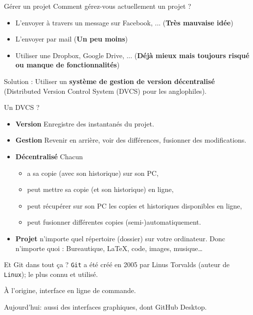 \documentclass{beamer}
\begin{document}
\begin{frame}{Gérer un projet}
Comment gérez-vous actuellement un projet ?

\begin{itemize}
    \item L'envoyer à travers un message sur Facebook, ... (\textbf{Très mauvaise idée})
    \item L'envoyer par mail (\textbf{Un peu moins})
    \item Utiliser une Dropbox, Google Drive, ... (\textbf{Déjà mieux mais toujours risqué ou manque de fonctionnalités})
\end{itemize}

Solution : Utiliser un \textbf{système de gestion de version décentralisé}
(Distributed Version Control System (DVCS) pour les anglophiles).
\end{frame}

\begin{frame}{Un DVCS ?}
    \begin{itemize}
        \item \textbf{Version} Enregistre des \og{}instantanés\fg{} du projet.
        \item \textbf{Gestion} Revenir en arrière, voir des différences,
            fusionner des modifications.
        \item \textbf{Décentralisé} Chacun
            \begin{itemize}
                \item a sa copie (avec son historique) sur son PC,
                \item peut mettre sa copie (et son historique) en ligne,
                \item peut récupérer sur son PC les copies et historiques disponibles en ligne,
                \item peut fusionner différentes copies (semi-)automatiquement.
            \end{itemize}
        \item \textbf{Projet} n'importe quel répertoire (\og dossier\fg) sur votre ordinateur. Donc
            n'importe quoi : Bureautique, \LaTeX, code, images, musique\dots
    \end{itemize}
\end{frame}

\begin{frame}{Et Git dans tout ça ?}
\texttt{Git} a été créé en 2005 par Linus Torvalds (auteur de
\texttt{Linux}); le plus connu et utilisé.

À l'origine, interface en ligne de commande.

Aujourd'hui: aussi des interfaces graphiques, dont GitHub Desktop.
\end{frame}
\end{document}
